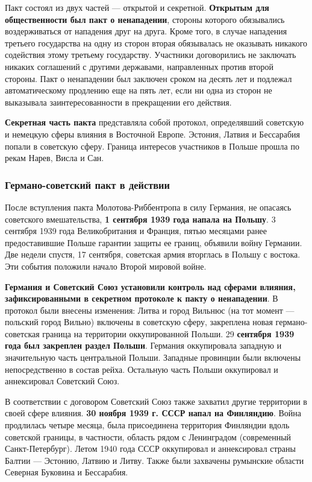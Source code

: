 \documentclass{article}
\begin{document}
\hfill

Пакт состоял из двух частей — открытой и секретной. \textbf{Открытым для общественности был пакт о ненападении}, стороны которого обязывались воздерживаться от нападения друг на друга. Кроме того, в случае нападения третьего государства на одну из сторон вторая обязывалась не оказывать никакого содействия этому третьему государству. Участники договорились не заключать никаких соглашений с другими державами, направленных против второй стороны. Пакт о ненападении был заключен сроком на десять лет и подлежал автоматическому продлению еще на пять лет, если ни одна из сторон не выказывала заинтересованности в прекращении его действия.

\hfill

\textbf{Секретная часть пакта} представляла собой протокол, определявший советскую и немецкую сферы влияния в Восточной Европе. Эстония, Латвия и Бессарабия попали в советскую сферу. Граница интересов участников в Польше прошла по рекам Нарев, Висла и Сан.

\subsubsection{Германо-советский пакт в действии}

После вступления пакта Молотова-Риббентропа в силу Германия, не опасаясь советского вмешательства, \textbf{1 сентября 1939 года напала на Польшу}. 3 сентября 1939 года Великобритания и Франция, пятью месяцами ранее предоставившие Польше гарантии защиты ее границ, объявили войну Германии. Две недели спустя, 17 сентября, советская армия вторглась в Польшу с востока. Эти события положили начало Второй мировой войне.

\hfill

\textbf{Германия и Советский Союз установили контроль над сферами влияния, зафиксированными в секретном протоколе к пакту о ненападении}. В протокол были внесены изменения: Литва и город Вильнюс (на тот момент — польский город Вильно) включены в советскую сферу, закреплена новая германо-советская граница на территории оккупированной Польши. 29 \textbf{сентября 1939 года был закреплен раздел Польши}. Германия оккупировала западную и значительную часть центральной Польши. Западные провинции были включены непосредственно в состав рейха. Остальную часть Польши оккупировал и аннексировал Советский Союз.

\hfill

В соответствии с договором Советский Союз также захватил  другие территории в своей сфере влияния. \textbf{30 ноября 1939 г. СССР напал на Финляндию}. Война продлилась четыре месяца, была присоединена территория Финляндии вдоль советской границы, в частности, область рядом с Ленинградом (современный Санкт-Петербург). Летом 1940 года СССР оккупировал и аннексировал страны Балтии — Эстонию, Латвию и Литву. Также были захвачены румынские области Северная Буковина и Бессарабия.
\end{document}
